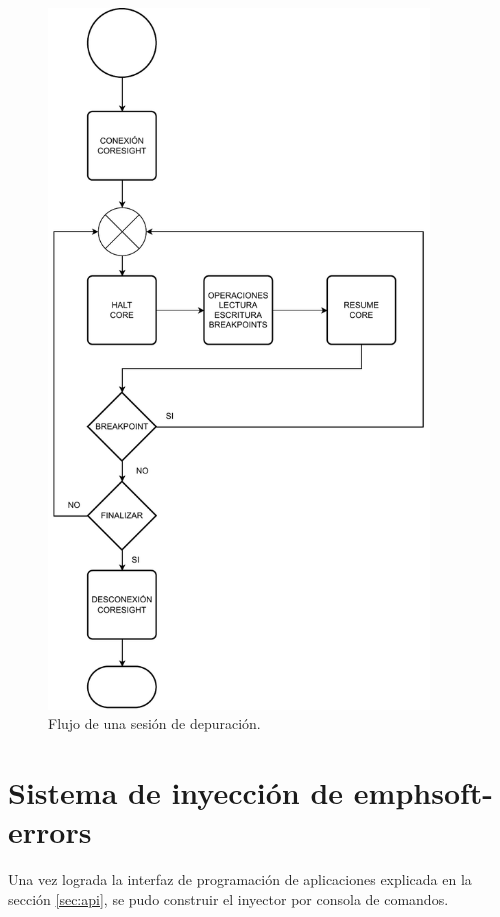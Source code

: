 \begin{figure}[htbp]
	\centering
	\includegraphics[width=0.9\textwidth]{./Figures/debugsession.pdf}
    \caption{Flujo de una sesión de depuración.}
	\label{fig:debugsession}
\end{figure}

\section{Sistema de inyección de emph{soft-errors}}
\label{sec:sise}

Una vez lograda la interfaz de programación de aplicaciones explicada en la sección \ref{sec:api}, se pudo construir el inyector por consola de comandos.

